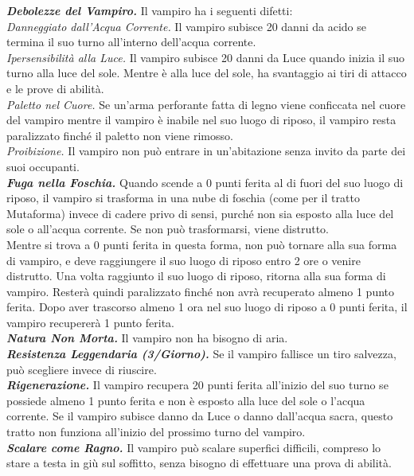 \begin{multicols}{2}
\emph{\textbf{Debolezze del Vampiro.}} Il vampiro ha i seguenti difetti:\\
\emph{Danneggiato dall'Acqua Corrente.} Il vampiro subisce 20 danni da acido se termina il suo turno all'interno dell'acqua corrente.\\
\emph{Ipersensibilità alla Luce.} Il vampiro subisce 20 danni da Luce quando inizia il suo turno alla luce del sole. Mentre è alla luce del sole, ha svantaggio ai tiri di attacco e le prove di abilità. \\
\emph{Paletto nel Cuore.} Se un'arma perforante fatta di legno viene conficcata nel cuore del vampiro mentre il vampiro è inabile nel suo luogo di riposo, il vampiro resta paralizzato finché il paletto non viene rimosso.\\
\emph{Proibizione.} Il vampiro non può entrare in un'abitazione senza invito da parte dei suoi occupanti.\\
\emph{\textbf{Fuga nella Foschia.}} Quando scende a 0 punti ferita al di fuori del suo luogo di riposo, il vampiro si trasforma in una nube di foschia (come per il tratto Mutaforma) invece di cadere privo di sensi, purché non sia esposto alla luce del sole o all'acqua corrente. Se non può trasformarsi, viene distrutto.\\
Mentre si trova a 0 punti ferita in questa forma, non può tornare alla sua forma di vampiro, e deve raggiungere il suo luogo di riposo entro 2 ore o venire distrutto. Una volta raggiunto il suo luogo di riposo, ritorna alla sua forma di vampiro. Resterà quindi paralizzato finché non avrà recuperato almeno 1 punto ferita. Dopo aver trascorso almeno 1 ora nel suo luogo di riposo a 0 punti ferita, il vampiro recupererà 1 punto ferita.\\
\emph{\textbf{Natura Non Morta.}} Il vampiro non ha bisogno di aria. \\
\emph{\textbf{Resistenza Leggendaria (3/Giorno).}} Se il vampiro fallisce un tiro salvezza, può scegliere invece di riuscire.\\
\emph{\textbf{Rigenerazione.}} Il vampiro recupera 20 punti ferita all'inizio del suo turno se possiede almeno 1 punto ferita e non è esposto alla luce del sole o l'acqua corrente. Se il vampiro subisce danno da Luce o danno dall'acqua sacra, questo tratto non funziona all'inizio del prossimo turno del vampiro.\\
\emph{\textbf{Scalare come Ragno.}} Il vampiro può scalare superfici difficili, compreso lo stare a testa in giù sul soffitto, senza bisogno di effettuare una prova di abilità.\\

\end{multicols}
